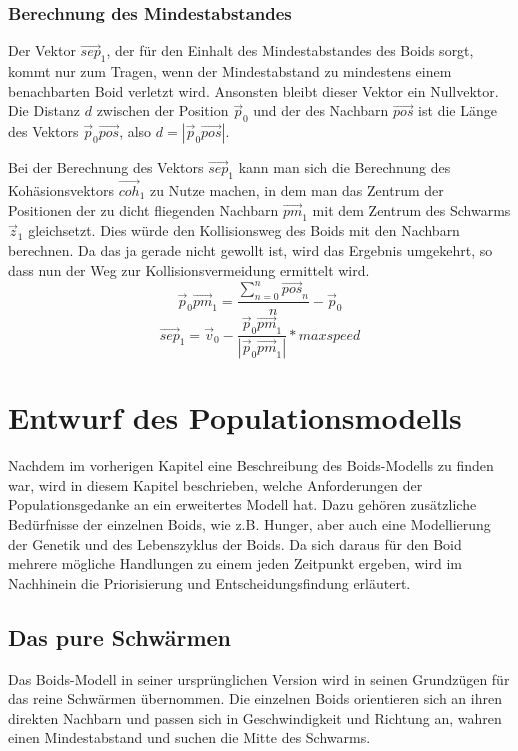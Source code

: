 \documentclass[draft=false
              ,paper=a4
              ,twoside=false
              ,fontsize=11pt
              ,headsepline
              ,BCOR10mm
              ,DIV11
              ,bibtotoc
              ,liststotoc
              ]{scrbook}
\begin{document}
\subsection{Berechnung des Mindestabstandes}
Der Vektor \(\vec{sep}_1\), der für den Einhalt des Mindestabstandes des Boids sorgt, kommt nur zum Tragen, wenn der Mindestabstand zu mindestens einem benachbarten Boid verletzt wird. Ansonsten bleibt dieser Vektor ein Nullvektor. Die Distanz \(d\) zwischen der Position \(\vec{p}_0\) und der des Nachbarn \(\vec{pos}\) ist die Länge des Vektors \(\vec{p}_0\vec{pos}\), also \(d = |\vec{p}_0\vec{pos}|\).

Bei der Berechnung des Vektors \(\vec{sep}_1\) kann man sich die Berechnung des Kohäsionsvektors \(\vec{coh}_1\) zu Nutze machen, in dem man das Zentrum der Positionen der zu dicht fliegenden Nachbarn \(\vec{pm}_1\) mit dem Zentrum des Schwarms \(\vec{z}_1\) gleichsetzt. Dies würde den Kollisionsweg des Boids mit den Nachbarn berechnen. Da das ja gerade nicht gewollt ist, wird das Ergebnis umgekehrt, so dass nun der Weg zur Kollisionsvermeidung ermittelt wird.
\[\vec{p}_0\vec{pm}_1 = \frac{\sum \limits_{n=0}^n \vec{pos}_n}{n} - \vec{p}_0\]
\[\vec{sep}_1 = \vec{v}_0 - \frac{\vec{p}_0\vec{pm}_1}{|\vec{p}_0\vec{pm}_1|} * maxspeed\]

\chapter{Entwurf des Populationsmodells}\label{modell}
Nachdem im vorherigen Kapitel eine Beschreibung des Boids-Modells zu finden war, wird in diesem Kapitel beschrieben, welche Anforderungen der Populationsgedanke an ein erweitertes Modell hat. Dazu gehören zusätzliche Bedürfnisse der einzelnen Boids, wie z.B. Hunger, aber auch eine Modellierung der Genetik und des Lebenszyklus der Boids. Da sich daraus für den Boid mehrere mögliche Handlungen zu einem jeden Zeitpunkt ergeben, wird im Nachhinein die Priorisierung und Entscheidungsfindung erläutert.
\section{Das pure Schwärmen}
Das Boids-Modell in seiner ursprünglichen Version wird in seinen Grundzügen für das reine Schwärmen übernommen. Die einzelnen Boids orientieren sich an ihren direkten Nachbarn und passen sich in Geschwindigkeit und Richtung an, wahren einen Mindestabstand und suchen die Mitte des Schwarms.
\end{document}
